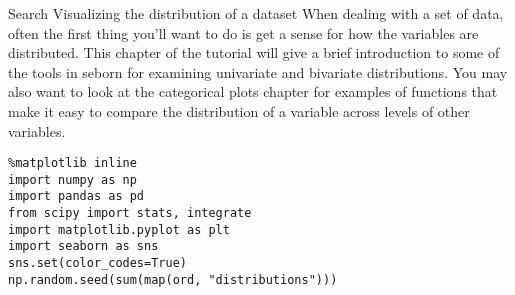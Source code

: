 
Search
Visualizing the distribution of a dataset
When dealing with a set of data, often the first thing you’ll want to do is get a sense for how the variables are distributed. This chapter of the tutorial will give a brief introduction to some of the tools in seborn for examining univariate and bivariate distributions. You may also want to look at the categorical plots chapter for examples of functions that make it easy to compare the distribution of a variable across levels of other variables.
\begin{frame}[fragile]
\begin{framed}
\begin{verbatim}
%matplotlib inline
import numpy as np
import pandas as pd
from scipy import stats, integrate
import matplotlib.pyplot as plt
import seaborn as sns
sns.set(color_codes=True)
np.random.seed(sum(map(ord, "distributions")))
\end{verbatim}
\end{framed}
\end{frame}

